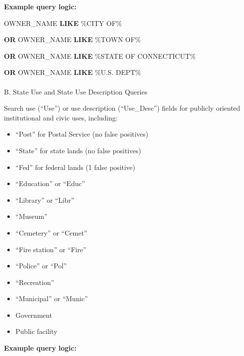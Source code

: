 \documentclass[
  letterpaper,
  DIV=11,
  numbers=noendperiod]{scrreprt}
\makeatletter
\let\oldparagraph\paragraph
\renewcommand{\paragraph}{
    \@ifstar
      \xxxParagraphStar
      \xxxParagraphNoStar
  }
\newcommand{\xxxParagraphStar}[1]{\oldparagraph*{#1}\mbox{}}
\newcommand{\xxxParagraphNoStar}[1]{\oldparagraph{#1}\mbox{}}
\newenvironment{Shaded}{\begin{snugshade}}{\end{snugshade}}
\newcommand{\KeywordTok}[1]{\textcolor[rgb]{0.00,0.23,0.31}{\textbf{#1}}}
\newcommand{\NormalTok}[1]{\textcolor[rgb]{0.00,0.23,0.31}{#1}}
\newcommand{\StringTok}[1]{\textcolor[rgb]{0.13,0.47,0.30}{#1}}
\providecommand{\tightlist}{%
  \setlength{\itemsep}{0pt}\setlength{\parskip}{0pt}}
\makeatother
\begin{document}
\textbf{Example query logic:}

\begin{Shaded}
\begin{Highlighting}[]
\NormalTok{OWNER\_NAME }\KeywordTok{LIKE} \StringTok{\textquotesingle{}\%CITY OF\%\textquotesingle{}}

\KeywordTok{OR}\NormalTok{ OWNER\_NAME }\KeywordTok{LIKE} \StringTok{\textquotesingle{}\%TOWN OF\%\textquotesingle{}}

\KeywordTok{OR}\NormalTok{ OWNER\_NAME }\KeywordTok{LIKE} \StringTok{\textquotesingle{}\%STATE OF CONNECTICUT\%\textquotesingle{}}

\KeywordTok{OR}\NormalTok{ OWNER\_NAME }\KeywordTok{LIKE} \StringTok{\textquotesingle{}\%U.S. DEPT\%\textquotesingle{}}
\end{Highlighting}
\end{Shaded}

\paragraph{B. State Use and State Use Description
Queries}\label{b.-state-use-and-state-use-description-queries}

Search use (``Use'') or use description (``Use\_Desc'') fields for
publicly oriented institutional and civic uses, including:

\begin{itemize}
\tightlist
\item
  ``Post'' for Postal Service (no false positives)
\item
  ``State'' for state lands (no false positives)
\item
  ``Fed'' for federal lands (1 false positive)
\item
  ``Education'' or ``Educ''
\item
  ``Library'' or ``Libr''
\item
  ``Museum''
\item
  ``Cemetery'' or ``Cemet''
\item
  ``Fire station'' or ``Fire''
\item
  ``Police'' or ``Pol''
\item
  ``Recreation''
\item
  ``Municipal'' or ``Munic''
\item
  Government
\item
  Public facility
\end{itemize}

\textbf{Example query logic:}
\end{document}
